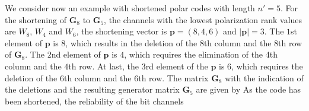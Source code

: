 \documentclass[10pt,twocolumn]{IEEEtran}
\begin{document}
We consider now an example with shortened polar codes with length
$n'= 5$. For the shortening of $\textbf{G}_8$ to $\textbf{G}_5$, the
channels with the lowest polarization rank values are $W_8$, $W_4$
and $W_6$, the shortening vector is $\textbf{p}=(8,4,6)$ and
$|\textbf{p}|=3$. The $1$st element of $\textbf{p}$ is 8, which
results in the deletion of the $8$th column and the $8$th row of
$\textbf{G}_8$. The $2$nd element of $\textbf{p}$ is $4$, which
requires the elimination of the 4th column and the $4$th row. At
last, the $3$rd element of the $\textbf{p}$ is 6, which requires the
deletion of the $6$th column and the $6$th row. The matrix
$\textbf{G}_8$ with the indication of the deletions and the
resulting generator matrix $\textbf{G}_5$ are given by
As the code has been shortened, the reliability of the bit channels
\end{document}
